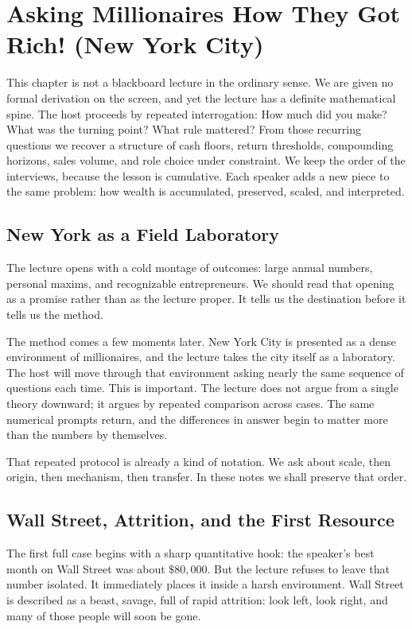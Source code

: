 \chapter{Asking Millionaires How They Got Rich! (New York City)}

This chapter is not a blackboard lecture in the ordinary sense. We are given no formal derivation on the screen, and yet the lecture has a definite mathematical spine. The host proceeds by repeated interrogation: How much did you make? What was the turning point? What rule mattered? From those recurring questions we recover a structure of cash floors, return thresholds, compounding horizons, sales volume, and role choice under constraint. We keep the order of the interviews, because the lesson is cumulative. Each speaker adds a new piece to the same problem: how wealth is accumulated, preserved, scaled, and interpreted.

\section{New York as a Field Laboratory}

The lecture opens with a cold montage of outcomes: large annual numbers, personal maxims, and recognizable entrepreneurs. We should read that opening as a promise rather than as the lecture proper. It tells us the destination before it tells us the method.

The method comes a few moments later. New York City is presented as a dense environment of millionaires, and the lecture takes the city itself as a laboratory. The host will move through that environment asking nearly the same sequence of questions each time. This is important. The lecture does not argue from a single theory downward; it argues by repeated comparison across cases. The same numerical prompts return, and the differences in answer begin to matter more than the numbers by themselves.

That repeated protocol is already a kind of notation. We ask about scale, then origin, then mechanism, then transfer. In these notes we shall preserve that order.

\section{Wall Street, Attrition, and the First Resource}

The first full case begins with a sharp quantitative hook: the speaker's best month on Wall Street was about \(\$80{,}000\). But the lecture refuses to leave that number isolated. It immediately places it inside a harsh environment. Wall Street is described as a beast, savage, full of rapid attrition: look left, look right, and many of those people will soon be gone.

